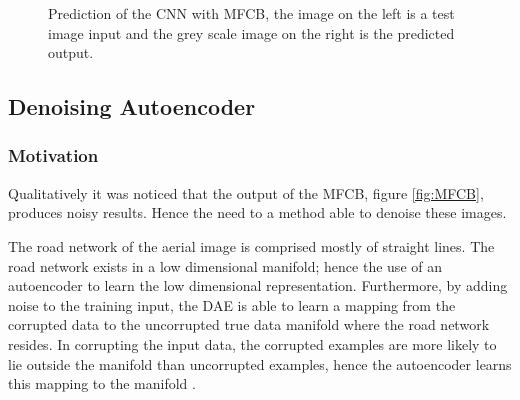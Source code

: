 \documentclass[10pt,conference,compsocconf]{IEEEtran}
\begin{document}
\begin{figure}[h!]
\caption{Prediction of the CNN with MFCB, the image on the left is a test image input and the grey scale image on the right is the predicted output.}
\label{fig:classbalancing}
\end{figure}

\subsection{Denoising Autoencoder}
\label{DAE}

\subsubsection{Motivation}

Qualitatively it was noticed that the output of the MFCB, figure \ref{fig:MFCB}, produces noisy results. Hence the need to a method able to denoise these images.

The road network of the aerial image is comprised mostly of straight lines. The road network exists in a low dimensional manifold; hence the use of an autoencoder to learn the low dimensional representation. Furthermore, by adding noise to the training input, the DAE is able to learn a mapping from the corrupted data to the uncorrupted true data manifold where the road network resides. In corrupting the input data, the corrupted examples are more likely to lie outside the manifold than uncorrupted examples, hence the autoencoder learns this mapping to the manifold \cite{VincentPASCALVINCENT2010}. 
\end{document}

